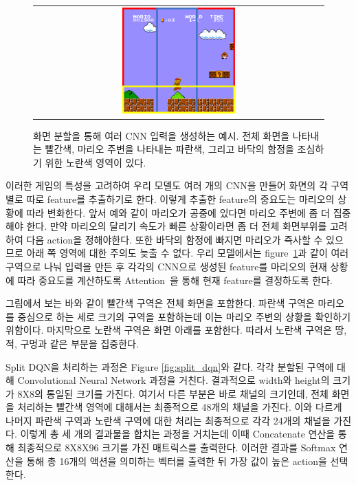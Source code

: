 \begin{figure}[]
\begin{center}
\begin{tabular}{c}
     \includegraphics[width=0.4\textwidth]{FIG/split_screen.pdf} \\
\end{tabular}
\caption{
	화면 분할을 통해 여러 CNN 입력을 생성하는 예시. 전체 화면을 나타내는 빨간색, 마리오 주변을 나타내는 파란색, 그리고 바닥의 함정을 조심하기 위한 노란색 영역이 있다.
}
\label{fig:split_screen}
\end{center}
\end{figure}

이러한 게임의 특성을 고려하여 우리 모델도 여러 개의 CNN을 만들어 화면의 각 구역별로 따로 feature를 추출하기로 한다.
이렇게 추출한 feature의 중요도는 마리오의 상황에 따라 변화한다. 앞서 예와 같이 마리오가 공중에 있다면 마리오 주변에 좀 더 집중해야 한다.
만약 마리오의 달리기 속도가 빠른 상황이라면 좀 더 전체 화면부위를 고려하여 다음 action을 정해야한다.
또한 바닥의 함정에 빠지면 마리오가 즉사할 수 있으므로 아래 쪽 영역에 대한 주의도 늦출 수 없다.
우리 모델에서는 figure~\ref{fig:split_screen}과 같이 여러 구역으로 나눠 입력을 만든 후 각각의 CNN으로 생성된 feature를 마리오의 현재 상황에 따라 중요도를 계산하도록 Attention~\cite{Attention}을 통해 현재 feature를 결정하도록 한다.

그림에서 보는 바와 같이 빨간색 구역은 전체 화면을 포함한다. 
파란색 구역은 마리오를 중심으로 하는 세로 크기의 구역을 포함하는데 이는 마리오 주변의 상황을 확인하기 위함이다.
마지막으로 노란색 구역은 화면 아래를 포함한다. 
따라서 노란색 구역은 땅, 적, 구멍과 같은 부분을 집중한다. 

Split DQN을 처리하는 과정은 Figure \ref{fig:split_dqn}와 같다. 
각각 분할된 구역에 대해 Convolutional Neural Network 과정을 거친다. 
결과적으로 width와 height의 크기가 8X8의 통일된 크기를 가진다. 
여기서 다른 부분은 바로 채널의 크기인데, 전체 화면을 처리하는 빨간색 영역에 대해서는 최종적으로 48개의 채널을 가진다.
이와 다르게 나머지 파란색 구역과 노란색 구역에 대한 처리는 최종적으로 각각 24개의 채널을 가진다. 
이렇게 총 세 개의 결과물을 합치는 과정을 거치는데 이때 Concatenate 연산을 통해 최종적으로 8X8X96 크기를 가진 매트릭스를 출력한다. 
이러한 결과를 Softmax 연산을 통해 총 16개의 액션을 의미하는 벡터를 출력한 뒤 가장 값이 높은 action을 선택한다. 

